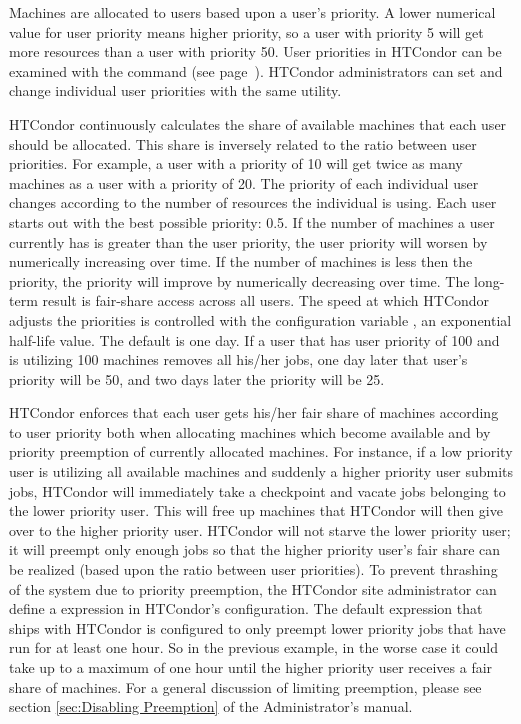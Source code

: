 Machines are allocated to users based upon a user's priority.
A lower numerical value for user priority means higher priority,
so a user with priority 5 will get more resources than
a user with priority 50.
User priorities in HTCondor can be examined with the 
command (see page~\pageref{man-condor-userprio}).
HTCondor administrators can set and change individual user priorities
with the same utility.

HTCondor continuously calculates the share of available machines that each
user should be allocated.    This share is inversely related to the ratio
between user priorities.
For example, a user with a priority of 10 will get twice as many
machines as a user with a priority of 20.
The priority of each individual user changes according to
the number of resources the individual is using.
Each user starts out with the best possible priority: 0.5.
If the number of machines a user currently has is greater than 
the user priority,
the user priority will worsen by numerically increasing over time.
If the number of machines is less then the priority,
the priority will improve by numerically decreasing over time. 
The long-term result is fair-share access across all users.
The speed at which HTCondor adjusts the priorities is
controlled with the configuration variable ,
an exponential half-life value.
The default is one day.
If a user that has user priority of 100 and is
utilizing 100 machines removes all his/her jobs,
one day later that user's
priority will be 50, and two days later the priority will be 25.

HTCondor enforces that each user gets his/her fair share of machines
according to user priority both when allocating machines which become
available and by priority preemption of currently allocated machines.
For instance, if a low priority user is utilizing all available machines
and suddenly a higher priority user submits jobs, HTCondor will
immediately take a checkpoint and vacate jobs belonging to the lower priority
user. This will free up machines that HTCondor will then give over to the
higher priority user. HTCondor will not starve the lower priority user; it
will preempt only enough jobs so that the higher priority user's fair
share can be realized (based upon the ratio between user priorities). To
prevent thrashing of the system due to priority preemption, the HTCondor 
site administrator can define a  expression in HTCondor's configuration.
The default expression that ships with HTCondor is configured to only preempt 
lower priority jobs that have run
for at least one hour. So in the previous example, in the worse case it
could take up to a maximum of one hour until the higher priority user
receives a fair share of machines.
For a general discussion of
limiting preemption,
please see
section \ref{sec:Disabling Preemption} of the Administrator's manual.

